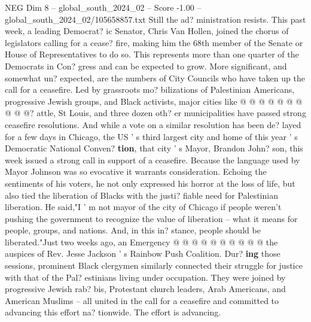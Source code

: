 \begin{textsample}{NEG Dim 8 – global\_south\_2024\_02 – Score -1.00 – global\_south\_2024\_02/105658857.txt}
Still the ad? ministration resists.
This past week, a leading Democrat? ic Senator, Chris Van Hollen, joined the chorus of legislators calling for a cease? fire, making him the 68th member of the Senate or House of Representatives to do so.
This represents more than one quarter of the Democrats in Con? gress and can be expected to grow.
More significant, and somewhat un? expected, are the numbers of City Councils who have taken up the call for a ceasefire.
Led by grassroots mo? bilizations of Palestinian Americans, progressive Jewish groups, and Black activists, major cities like @ @ @ @ @ @ @ @ @ @? attle, St Louis, and three dozen oth? er municipalities have passed strong ceasefire resolutions.
And while a vote on a similar resolution has been de? layed for a few days in Chicago, the US ' s third largest city and home of this year ' s Democratic National Conven? \textbf{tion}, that city ' s Mayor, Brandon John? son, this week issued a strong call in support of a ceasefire.
Because the language used by Mayor Johnson was so evocative it warrants consideration.
Echoing the sentiments of his voters, he not only expressed his horror at the loss of life, but also tied the liberation of Blacks with the justi? fiable need for Palestinian liberation.
He said,"I ' m not mayor of the city of Chicago if people weren't pushing the government to recognize the value of liberation -- what it means for people, groups, and nations.
And, in this in? stance, people should be liberated."Just two weeks ago, an Emergency @ @ @ @ @ @ @ @ @ @ the auspices of Rev.
Jesse Jackson ' s Rainbow Push Coalition.
Dur? \textbf{ing} those sessions, prominent Black clergymen similarly connected their struggle for justice with that of the Pal? estinians living under occupation.
They were joined by progressive Jewish rab? bis, Protestant church leaders, Arab Americans, and American Muslims -- all united in the call for a ceasefire and committed to advancing this effort na? tionwide.
The effort is advancing.

\end{textsample}
